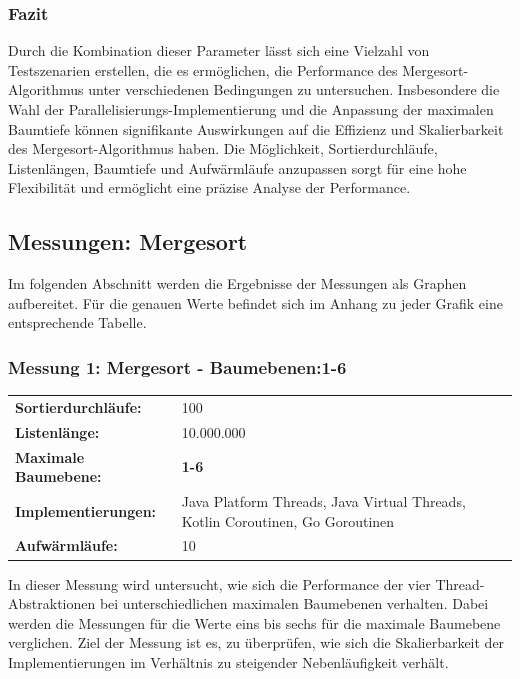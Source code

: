\documentclass[fontsize=12pt,paper=a4,twoside=semi,parskip=half-,headsepline,headinclude]{scrreprt}
\begin{document}
\subsubsection{Fazit}

Durch die Kombination dieser Parameter lässt sich eine Vielzahl von Testszenarien erstellen, die es ermöglichen, die Performance des Mergesort-Algorithmus unter verschiedenen Bedingungen zu untersuchen. Insbesondere die Wahl der Parallelisierungs-Implementierung und die Anpassung der maximalen Baumtiefe können signifikante Auswirkungen auf die Effizienz und Skalierbarkeit des Mergesort-Algorithmus haben. Die Möglichkeit, Sortierdurchläufe, Listenlängen, 
Baumtiefe und Aufwärmläufe anzupassen sorgt für eine hohe Flexibilität und ermöglicht eine präzise Analyse der Performance.

\subsection{Messungen: Mergesort}

Im folgenden Abschnitt werden die Ergebnisse der Messungen 
als Graphen aufbereitet. Für die genauen Werte befindet sich im 
Anhang zu jeder Grafik eine entsprechende Tabelle.

\subsubsection{Messung 1: Mergesort - Baumebenen:1-6}

\begin{tabularx}{\textwidth}{@{}lX@{}}
	\textbf{Sortierdurchläufe:} & 100 \\
	\textbf{Listenlänge:} & 10.000.000 \\
	\textbf{Maximale Baumebene:} & \textbf{1-6} \\
	\textbf{Implementierungen:} & Java Platform Threads, Java Virtual Threads, Kotlin Coroutinen, Go Goroutinen \\
	\textbf{Aufwärmläufe:} & 10
\end{tabularx}

In dieser Messung wird untersucht, wie sich die Performance der vier Thread-Ab\-strak\-tio\-nen bei unterschiedlichen maximalen Baumebenen verhalten. Dabei werden die Messungen für die Werte eins bis sechs für die maximale Baumebene verglichen. Ziel der Messung ist es, zu überprüfen, wie sich die Skalierbarkeit der Implementierungen im Verhältnis zu steigender Nebenläufigkeit verhält.
\end{document}
